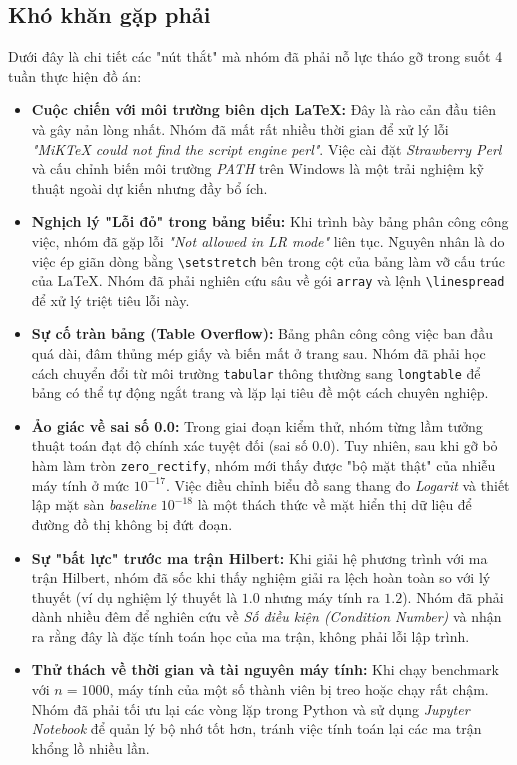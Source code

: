 \subsection{Khó khăn gặp phải}
Dưới đây là chi tiết các "nút thắt" mà nhóm đã phải nỗ lực tháo gỡ trong suốt 4 tuần thực hiện đồ án:

\begin{itemize}[itemsep=0.15cm]
    \item \textbf{Cuộc chiến với môi trường biên dịch \LaTeX:} Đây là rào cản đầu tiên và gây nản lòng nhất. Nhóm đã mất rất nhiều thời gian để xử lý lỗi \textit{"MiKTeX could not find the script engine perl"}. Việc cài đặt \textit{Strawberry Perl} và cấu chỉnh biến môi trường \textit{PATH} trên Windows là một trải nghiệm kỹ thuật ngoài dự kiến nhưng đầy bổ ích.
    \item \textbf{Nghịch lý "Lỗi đỏ" trong bảng biểu:} Khi trình bày bảng phân công công việc, nhóm đã gặp lỗi \textit{"Not allowed in LR mode"} liên tục. Nguyên nhân là do việc ép giãn dòng bằng \texttt{\textbackslash setstretch} bên trong cột của bảng làm vỡ cấu trúc của \LaTeX. Nhóm đã phải nghiên cứu sâu về gói \texttt{array} và lệnh \texttt{\textbackslash linespread} để xử lý triệt tiêu lỗi này.
    \item \textbf{Sự cố tràn bảng (Table Overflow):} Bảng phân công công việc ban đầu quá dài, đâm thủng mép giấy và biến mất ở trang sau. Nhóm đã phải học cách chuyển đổi từ môi trường \texttt{tabular} thông thường sang \texttt{longtable} để bảng có thể tự động ngắt trang và lặp lại tiêu đề một cách chuyên nghiệp.
    \item \textbf{Ảo giác về sai số 0.0:} Trong giai đoạn kiểm thử, nhóm từng lầm tưởng thuật toán đạt độ chính xác tuyệt đối (sai số 0.0). Tuy nhiên, sau khi gỡ bỏ hàm làm tròn \texttt{zero\_rectify}, nhóm mới thấy được "bộ mặt thật" của nhiễu máy tính ở mức $10^{-17}$. Việc điều chỉnh biểu đồ sang thang đo \textit{Logarit} và thiết lập mặt sàn \textit{baseline} $10^{-18}$ là một thách thức về mặt hiển thị dữ liệu để đường đồ thị không bị đứt đoạn.
    \item \textbf{Sự "bất lực" trước ma trận Hilbert:} Khi giải hệ phương trình với ma trận Hilbert, nhóm đã sốc khi thấy nghiệm giải ra lệch hoàn toàn so với lý thuyết (ví dụ nghiệm lý thuyết là $1.0$ nhưng máy tính ra $1.2$). Nhóm đã phải dành nhiều đêm để nghiên cứu về \textit{Số điều kiện (Condition Number)} và nhận ra rằng đây là đặc tính toán học của ma trận, không phải lỗi lập trình.
    \item \textbf{Thử thách về thời gian và tài nguyên máy tính:} Khi chạy benchmark với $n=1000$, máy tính của một số thành viên bị treo hoặc chạy rất chậm. Nhóm đã phải tối ưu lại các vòng lặp trong Python và sử dụng \textit{Jupyter Notebook} để quản lý bộ nhớ tốt hơn, tránh việc tính toán lại các ma trận khổng lồ nhiều lần.
\end{itemize}